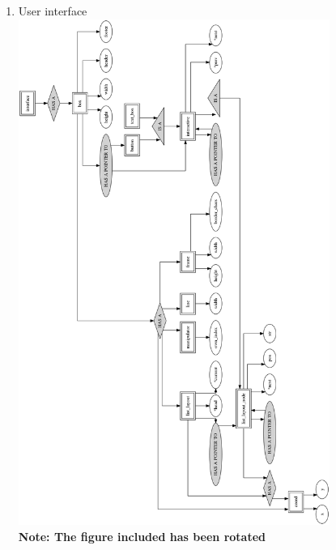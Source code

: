 \documentclass[11pt]{article}%
\begin{document}
\begin{enumerate}
\item{\large{ User interface }}
\\
\includegraphics[width = 0.8\textwidth]{fig/uir.png}
\\
\small\textbf{Note: The figure included has been rotated}


\end{enumerate}

\newpage
\end{document}

